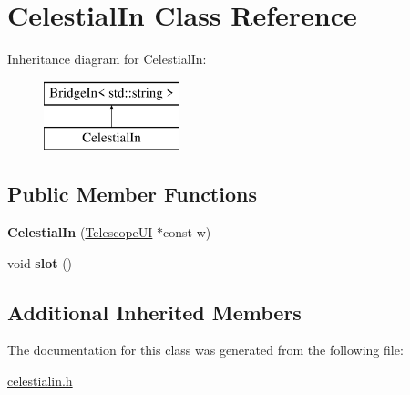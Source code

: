 \hypertarget{classCelestialIn}{}\section{Celestial\+In Class Reference}
\label{classCelestialIn}
Inheritance diagram for Celestial\+In\+:\begin{figure}[H]
\begin{center}
\leavevmode
\includegraphics[height=2.000000cm]{classCelestialIn}
\end{center}
\end{figure}
\subsection*{Public Member Functions}
\begin{DoxyCompactItemize}
\item 
\mbox{\label{classCelestialIn_a4d801ed723cdaefbfe60e9249558ce97}} 
{\bfseries Celestial\+In} (\mbox{\hyperlink{classTelescopeUI}{Telescope\+UI}} $\ast$const w)
\item 
\mbox{\label{classCelestialIn_af0eebe637a588016616d4ded60c34ee8}} 
void {\bfseries slot} ()
\end{DoxyCompactItemize}
\subsection*{Additional Inherited Members}


The documentation for this class was generated from the following file\+:\begin{DoxyCompactItemize}
\item 
\mbox{\hyperlink{celestialin_8h}{celestialin.\+h}}\end{DoxyCompactItemize}
